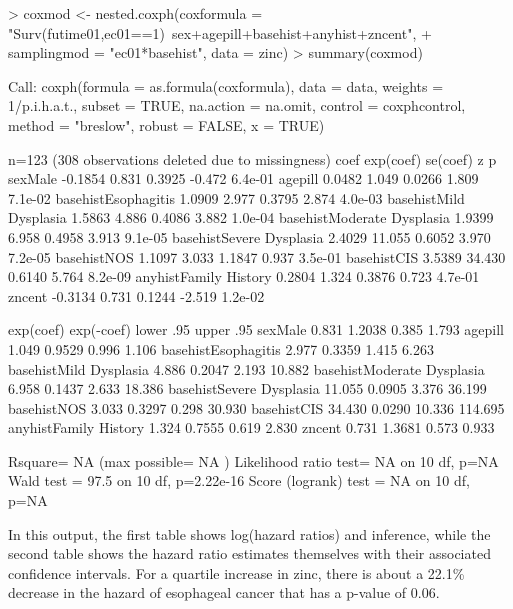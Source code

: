 \documentclass[10pt]{article}
\begin{document}
\begin{Schunk}
\begin{Sinput}
> coxmod <- nested.coxph(coxformula = "Surv(futime01,ec01==1)~sex+agepill+basehist+anyhist+zncent", 
+     samplingmod = "ec01*basehist", data = zinc)
> summary(coxmod)
\end{Sinput}
\begin{Soutput}
Call:
coxph(formula = as.formula(coxformula), data = data, weights = 1/p.i.h.a.t., 
    subset = TRUE, na.action = na.omit, control = coxphcontrol, 
    method = "breslow", robust = FALSE, x = TRUE)

  n=123 (308 observations deleted due to missingness)
                              coef exp(coef) se(coef)      z       p
sexMale                    -0.1854     0.831   0.3925 -0.472 6.4e-01
agepill                     0.0482     1.049   0.0266  1.809 7.1e-02
basehistEsophagitis         1.0909     2.977   0.3795  2.874 4.0e-03
basehistMild Dysplasia      1.5863     4.886   0.4086  3.882 1.0e-04
basehistModerate Dysplasia  1.9399     6.958   0.4958  3.913 9.1e-05
basehistSevere Dysplasia    2.4029    11.055   0.6052  3.970 7.2e-05
basehistNOS                 1.1097     3.033   1.1847  0.937 3.5e-01
basehistCIS                 3.5389    34.430   0.6140  5.764 8.2e-09
anyhistFamily History       0.2804     1.324   0.3876  0.723 4.7e-01
zncent                     -0.3134     0.731   0.1244 -2.519 1.2e-02

                           exp(coef) exp(-coef) lower .95 upper .95
sexMale                        0.831     1.2038     0.385     1.793
agepill                        1.049     0.9529     0.996     1.106
basehistEsophagitis            2.977     0.3359     1.415     6.263
basehistMild Dysplasia         4.886     0.2047     2.193    10.882
basehistModerate Dysplasia     6.958     0.1437     2.633    18.386
basehistSevere Dysplasia      11.055     0.0905     3.376    36.199
basehistNOS                    3.033     0.3297     0.298    30.930
basehistCIS                   34.430     0.0290    10.336   114.695
anyhistFamily History          1.324     0.7555     0.619     2.830
zncent                         0.731     1.3681     0.573     0.933

Rsquare= NA   (max possible= NA )
Likelihood ratio test= NA  on 10 df,   p=NA
Wald test            = 97.5  on 10 df,   p=2.22e-16
Score (logrank) test = NA  on 10 df,   p=NA
\end{Soutput}
\end{Schunk}

In this output, the first table shows log(hazard ratios) and inference, while the second
table shows the hazard ratio estimates themselves with their associated confidence
intervals.  For a quartile increase in zinc, there is about a 22.1\% decrease in the
hazard of esophageal cancer that has a p-value of 0.06.
\end{document}
